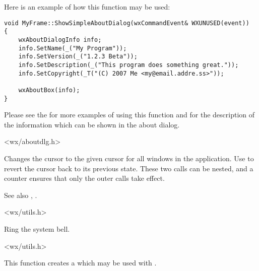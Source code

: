 Here is an example of how this function may be used:
\begin{verbatim}
void MyFrame::ShowSimpleAboutDialog(wxCommandEvent& WXUNUSED(event))
{
    wxAboutDialogInfo info;
    info.SetName(_("My Program"));
    info.SetVersion(_("1.2.3 Beta"));
    info.SetDescription(_("This program does something great."));
    info.SetCopyright(_T("(C) 2007 Me <my@email.addre.ss>"));

    wxAboutBox(info);
}
\end{verbatim}

Please see the  for more examples of
using this function and  for the
description of the information which can be shown in the about dialog.


<wx/aboutdlg.h>


\label{wxbeginbusycursor}


Changes the cursor to the given cursor for all windows in the application.
Use  to revert the cursor back
to its previous state. These two calls can be nested, and a counter
ensures that only the outer calls take effect.

See also , .


<wx/utils.h>


\label{wxbell}


Ring the system bell.


<wx/utils.h>


\label{wxcreatefiletipprovider}


This function creates a  which may be
used with .


